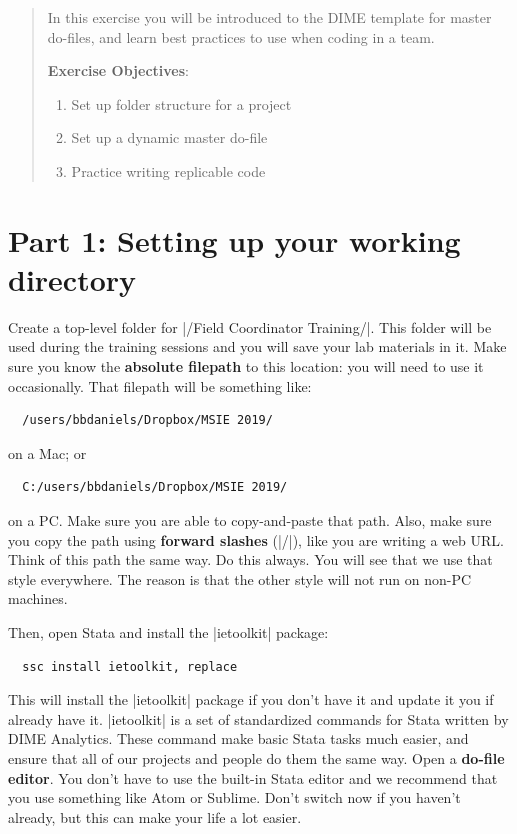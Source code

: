 \documentclass{tufte-handout}
\begin{document}
\begin{abstract}
In this exercise you will be introduced to the DIME template for master do-files,
and learn best practices to use when coding in a team.

\bigskip\noindent \textbf{Exercise Objectives}:
\begin{enumerate}
  \item Set up folder structure for a project
  \item Set up a dynamic master do-file
  \item Practice writing replicable code
\end{enumerate}
\end{abstract}

\section{Part 1: Setting up your working directory}

Create a top-level folder for |/Field Coordinator Training/|.
This folder will be used during the training sessions
and you will save your lab materials in it.
Make sure you know the \textbf{absolute filepath} to this location:
you will need to use it occasionally.
That filepath will be something like:
\begin{Verbatim}
  /users/bbdaniels/Dropbox/MSIE 2019/
\end{Verbatim}
on a Mac; or
\begin{Verbatim}
  C:/users/bbdaniels/Dropbox/MSIE 2019/
\end{Verbatim}
on a PC. Make sure you are able to copy-and-paste that path.
Also, make sure you copy the path using \textbf{forward slashes} (|/|),
like you are writing a web URL. Think of this path the same way.
Do this always. You will see that we use that style everywhere.
The reason is that the other style will not run on non-PC machines.

Then, open Stata and install the |ietoolkit| package:
\begin{Verbatim}
  ssc install ietoolkit, replace
\end{Verbatim}
This will install the |ietoolkit| package if you don’t have it
and update it you if already have it.
|ietoolkit| is a set of standardized commands for Stata
written by DIME Analytics.
These command make basic Stata tasks much easier,
and ensure that all of our projects and people do them the same way.
Open a \textbf{do-file editor}.
You don't have to use the built-in Stata editor
and we recommend that you use something like Atom or Sublime.
Don't switch now if you haven't already,
but this can make your life a lot easier.
\end{document}
